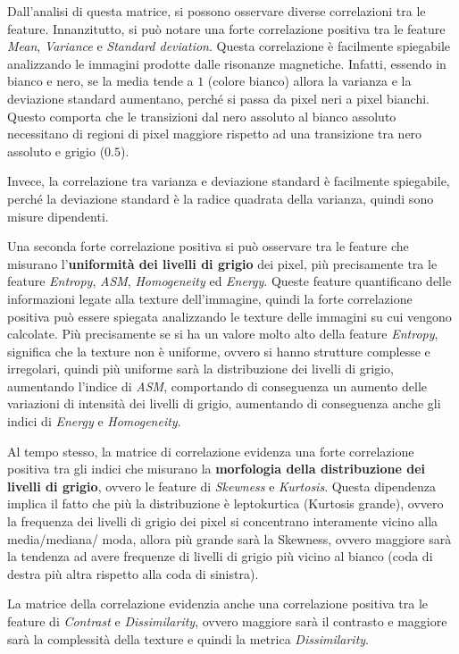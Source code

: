 Dall'analisi di questa matrice, si possono osservare diverse correlazioni tra le
feature. Innanzitutto, si può notare una forte correlazione positiva tra le feature
\textit{Mean}, \textit{Variance} e \textit{Standard deviation}. Questa correlazione
è facilmente spiegabile analizzando le immagini prodotte dalle risonanze magnetiche.
Infatti, essendo in bianco e nero, se la media tende a $1$ (colore bianco) allora
la varianza e la deviazione standard aumentano, perché si passa da pixel neri a 
pixel bianchi. Questo comporta che le transizioni dal nero assoluto al bianco
assoluto necessitano di regioni di pixel maggiore rispetto ad una transizione
tra nero assoluto e grigio ($0.5$).

Invece, la correlazione tra varianza e deviazione standard è facilmente spiegabile,
perché la deviazione standard è la radice quadrata della varianza, quindi sono 
misure dipendenti.

Una seconda forte correlazione positiva si può osservare tra le feature che
misurano l'\textbf{uniformità dei livelli di grigio} dei pixel, più precisamente
tra le feature \textit{Entropy}, \textit{ASM}, \textit{Homogeneity} ed
\textit{Energy}. Queste feature quantificano delle informazioni legate alla
texture dell'immagine, quindi la forte correlazione positiva può essere spiegata
analizzando le texture delle immagini su cui vengono calcolate. Più precisamente
se si ha un valore molto alto della feature \textit{Entropy}, significa che la
texture non è uniforme, ovvero si hanno strutture complesse e irregolari, quindi
più uniforme sarà la distribuzione dei livelli di grigio, aumentando l'indice
di \textit{ASM}, comportando di conseguenza un aumento delle variazioni di intensità
dei livelli di grigio, aumentando di conseguenza anche gli indici di \textit{Energy}
e \textit{Homogeneity}. 

Al tempo stesso, la matrice di correlazione evidenza una forte correlazione positiva
tra gli indici che misurano la \textbf{morfologia della distribuzione dei livelli di grigio},
ovvero le feature di \textit{Skewness} e \textit{Kurtosis}. Questa dipendenza implica il
fatto che più la distribuzione è leptokurtica (Kurtosis grande), ovvero la frequenza
dei livelli di grigio dei pixel si concentrano interamente vicino alla media/mediana/
moda, allora più grande sarà la Skewness, ovvero maggiore sarà la tendenza ad avere
frequenze di livelli di grigio più vicino al bianco (coda di destra più altra rispetto
alla coda di sinistra).

La matrice della correlazione evidenzia anche una correlazione positiva tra le
feature di \textit{Contrast} e \textit{Dissimilarity}, ovvero maggiore sarà il
contrasto e maggiore sarà la complessità della texture e quindi la metrica 
\textit{Dissimilarity}.

